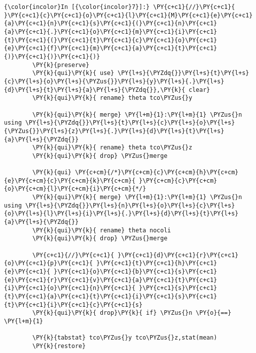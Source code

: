\documentclass[11pt,notitlepage]{article}\usepackage[]{graphicx}\usepackage[]{color}
\makeatletter
\newenvironment{kframe}{%
 \def\at@end@of@kframe{}%
 \ifinner\ifhmode%
  \def\at@end@of@kframe{\end{minipage}}%
  \begin{minipage}{\columnwidth}%
 \fi\fi%
 \def\FrameCommand##1{\hskip\@totalleftmargin \hskip-\fboxsep
 \colorbox{shadecolor}{##1}\hskip-\fboxsep
     \hskip-\linewidth \hskip-\@totalleftmargin \hskip\columnwidth}%
 \MakeFramed {\advance\hsize-\width
   \@totalleftmargin\z@ \linewidth\hsize
   \@setminipage}}%
 {\par\unskip\endMakeFramed%
 \at@end@of@kframe}
\newenvironment{knitrout}{}{} %
\makeatother
\begin{document}
\begin{enumerate}[a)]
\begin{knitrout}
\begin{kframe}
\begin{Verbatim}[commandchars=\\\{\}]
    \end{Verbatim}

    \begin{Verbatim}[commandchars=\\\{\}]
{\color{incolor}In [{\color{incolor}7}]:} \PY{c+c1}{//}\PY{c+c1}{ }\PY{c+c1}{c}\PY{c+c1}{o}\PY{c+c1}{l}\PY{c+c1}{M}\PY{c+c1}{e}\PY{c+c1}{a}\PY{c+c1}{n}\PY{c+c1}{s}\PY{c+c1}{(}\PY{c+c1}{n}\PY{c+c1}{a}\PY{c+c1}{.}\PY{c+c1}{o}\PY{c+c1}{m}\PY{c+c1}{i}\PY{c+c1}{t}\PY{c+c1}{(}\PY{c+c1}{t}\PY{c+c1}{c}\PY{c+c1}{o}\PY{c+c1}{e}\PY{c+c1}{f}\PY{c+c1}{m}\PY{c+c1}{a}\PY{c+c1}{t}\PY{c+c1}{)}\PY{c+c1}{)}\PY{c+c1}{)}
        \PY{k}{preserve}
        \PY{k}{qui}\PY{k}{ use} \PY{l+s}{\PYZdq{}}\PY{l+s}{t}\PY{l+s}{c}\PY{l+s}{o}\PY{l+s}{\PYZus{}}\PY{l+s}{y}\PY{l+s}{.}\PY{l+s}{d}\PY{l+s}{t}\PY{l+s}{a}\PY{l+s}{\PYZdq{}},\PY{k}{ clear}
        \PY{k}{qui}\PY{k}{ rename} theta tco\PYZus{}y
        
        \PY{k}{qui}\PY{k}{ merge} \PY{l+m}{1}:\PY{l+m}{1} \PYZus{}n using \PY{l+s}{\PYZdq{}}\PY{l+s}{t}\PY{l+s}{c}\PY{l+s}{o}\PY{l+s}{\PYZus{}}\PY{l+s}{z}\PY{l+s}{.}\PY{l+s}{d}\PY{l+s}{t}\PY{l+s}{a}\PY{l+s}{\PYZdq{}}
        \PY{k}{qui}\PY{k}{ rename} theta tco\PYZus{}z 
        \PY{k}{qui}\PY{k}{ drop} \PYZus{}merge
        
        \PY{k}{qui} \PY{c+cm}{/*}\PY{c+cm}{c}\PY{c+cm}{h}\PY{c+cm}{e}\PY{c+cm}{c}\PY{c+cm}{k}\PY{c+cm}{ }\PY{c+cm}{c}\PY{c+cm}{o}\PY{c+cm}{l}\PY{c+cm}{i}\PY{c+cm}{*/}
        \PY{k}{qui}\PY{k}{ merge} \PY{l+m}{1}:\PY{l+m}{1} \PYZus{}n using \PY{l+s}{\PYZdq{}}\PY{l+s}{n}\PY{l+s}{o}\PY{l+s}{c}\PY{l+s}{o}\PY{l+s}{l}\PY{l+s}{i}\PY{l+s}{.}\PY{l+s}{d}\PY{l+s}{t}\PY{l+s}{a}\PY{l+s}{\PYZdq{}}
        \PY{k}{qui}\PY{k}{ rename} theta nocoli
        \PY{k}{qui}\PY{k}{ drop} \PYZus{}merge
        
        \PY{c+c1}{//}\PY{c+c1}{ }\PY{c+c1}{d}\PY{c+c1}{r}\PY{c+c1}{o}\PY{c+c1}{p}\PY{c+c1}{ }\PY{c+c1}{t}\PY{c+c1}{h}\PY{c+c1}{e}\PY{c+c1}{ }\PY{c+c1}{o}\PY{c+c1}{b}\PY{c+c1}{s}\PY{c+c1}{e}\PY{c+c1}{r}\PY{c+c1}{v}\PY{c+c1}{a}\PY{c+c1}{t}\PY{c+c1}{i}\PY{c+c1}{o}\PY{c+c1}{n}\PY{c+c1}{ }\PY{c+c1}{s}\PY{c+c1}{t}\PY{c+c1}{a}\PY{c+c1}{t}\PY{c+c1}{i}\PY{c+c1}{s}\PY{c+c1}{t}\PY{c+c1}{i}\PY{c+c1}{c}\PY{c+c1}{s}
        \PY{k}{qui}\PY{k}{ drop}\PY{k}{ if} \PYZus{}n \PY{o}{==} \PY{l+m}{1} 
        
        \PY{k}{tabstat} tco\PYZus{}y tco\PYZus{}z,stat(mean)
        \PY{k}{restore}
\end{Verbatim}

    \begin{Verbatim}[commandchars=\\\{\}]


\end{Verbatim}
\end{kframe}
\end{knitrout}
\end{enumerate}
\end{document}
